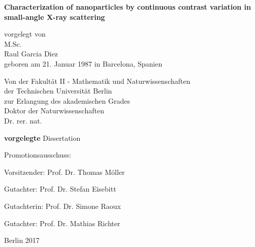 
\begin{titlepage}
{\noindent\sffamily\large%
    \begin{center}
        \vspace*{3ex}
        {\LARGE\bfseries\sffamily
            Characterization of nanoparticles by continuous contrast variation in small-angle X-ray scattering
        }
        \vspace{1cm}

        vorgelegt von \\
        M.Sc. \\
        Raul Garcia Diez \\
        geboren am 21. Januar 1987 in Barcelona, Spanien \\
        \vspace{4cm}

        Von der Fakultät II - Mathematik und Naturwissenschaften \\
        der Technischen Universität Berlin \\
        zur Erlangung des akademischen Grades \\
        Doktor der Naturwissenschaften \\
        Dr. rer. nat. \\
        \vspace{3ex}

        \textbf{vorgelegte} Dissertation \\
        \vspace{2cm}
    \end{center}

    Promotionsausschuss:
    \vspace{2ex}

    Vorsitzender: Prof. Dr. Thomas Möller

    Gutachter: Prof. Dr. Stefan Eisebitt

    Gutachterin: Prof. Dr. Simone Raoux

    Gutachter: Prof. Dr. Mathias Richter
    \vspace{1ex}


    \vfill
    \begin{center}
        Berlin 2017
    \end{center}
}
\end{titlepage}

\cleardoublepage

